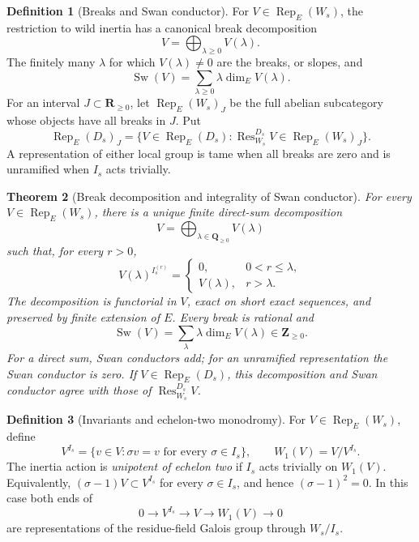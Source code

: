 \documentclass[10pt]{article}
\newtheorem{theorem}{Theorem}[section]
\theoremstyle{definition}
\newtheorem{definition}[theorem]{Definition}
\newcommand{\Rep}{\operatorname{Rep}}
\newcommand{\Sw}{\operatorname{Sw}}
\begin{document}
\begin{definition}[Breaks and Swan conductor]
For \(V\in\Rep_E(W_s)\), the restriction to wild inertia has a canonical
break decomposition
\[
                         V=\bigoplus_{\lambda\ge0}V(\lambda).
\]
The finitely many \(\lambda\) for which \(V(\lambda)\ne0\) are the breaks,
or slopes, and
\[
                 \Sw(V)=\sum_{\lambda\ge0}\lambda\dim_E V(\lambda).
\]
For an interval \(J\subset\mathbf R_{\ge0}\), let
\(\Rep_E(W_s)_J\) be the full abelian subcategory whose objects have all
breaks in \(J\).  Put
\[
 \Rep_E(D_s)_J=\{V\in\Rep_E(D_s):
       \operatorname{Res}^{D_s}_{W_s}V\in\Rep_E(W_s)_J\}.
\]
A representation of either local group is tame when all breaks are zero and
is unramified when \(I_s\) acts trivially.
\end{definition}

\begin{theorem}[Break decomposition and integrality of Swan conductor]
For every \(V\in\Rep_E(W_s)\), there is a unique finite direct-sum
decomposition
\[
 V=\bigoplus_{\lambda\in\mathbf Q_{\ge0}}V(\lambda)
\]
such that, for every \(r>0\),
\[
 V(\lambda)^{I_s^{(r)}}=
 \begin{cases}
 0,&0<r\le\lambda,\\
 V(\lambda),&r>\lambda.
 \end{cases}
\]
The decomposition is functorial in \(V\), exact on short exact sequences,
and preserved by finite extension of \(E\).  Every break is rational and
\[
 \Sw(V)=\sum_\lambda\lambda\dim_E V(\lambda)\in\mathbf Z_{\ge0}.
\]
For a direct sum, Swan conductors add; for an unramified representation the
Swan conductor is zero.  If \(V\in\Rep_E(D_s)\), this decomposition and
Swan conductor agree with those of
\(\operatorname{Res}^{D_s}_{W_s}V\).
\end{theorem}

\begin{definition}[Invariants and echelon-two monodromy]
For \(V\in\Rep_E(W_s)\), define
\[
 V^{I_s}=\{v\in V:\sigma v=v\text{ for every }\sigma\in I_s\},
 \qquad W_1(V)=V/V^{I_s}.
\]
The inertia action is \emph{unipotent of echelon two} if \(I_s\) acts
trivially on \(W_1(V)\).  Equivalently,
\((\sigma-1)V\subset V^{I_s}\) for every \(\sigma\in I_s\), and hence
\((\sigma-1)^2=0\).  In this case both ends of
\[
                  0\longrightarrow V^{I_s}\longrightarrow V
                    \longrightarrow W_1(V)\longrightarrow0
\]
are representations of the residue-field Galois group through
\(W_s/I_s\).
\end{definition}
\end{document}

